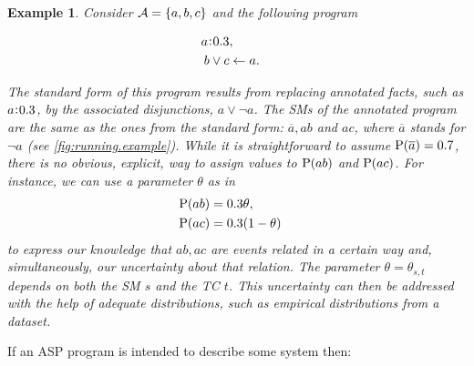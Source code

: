 \documentclass[a4paper, 10pt]{article}
\newtheorem{example}{Example}
\newcommand{\at}[1]{\ensuremath{\!\del{#1}}}
\newcommand{\co}[1]{\ensuremath{\overline{#1}}}
\newcommand{\fml}[1]{\ensuremath{{\cal #1}}}
\newcommand{\pr}[1]{\ensuremath{\mathrm{P}\at{#1}}}
\newcommand{\probfact}[2]{\ensuremath{#2\mkern-4mu:\mkern-4mu#1}}
\newcounter{remark}
\newcommand{\note}[1]{
    \stepcounter{remark}%
    {\!\!\color{red}/}\footnotemark[\arabic{remark}]\!\!%
    \footnotetext[\arabic{remark}]{{\color{red}/}#1}
}
\begin{document}
\begin{example}\label{running.example}
    Consider $\fml{A} = \set{a, b, c}$ and the following program

    \begin{equation}
        \begin{aligned}
            \probfact{0.3}{a} & ,\cr
            b \vee c          & \leftarrow a.
        \end{aligned}
        \label{eq:example.1}
    \end{equation}

    The \emph{standard form} of this program results from replacing annotated facts, such as $\probfact{0.3}{a}$, by the associated disjunctions, $a \vee \neg a$. The \aclp{SM} of the annotated program are the same as the ones from the standard form:  $\co{a}, ab$ and $ac$, where $\co{a}$ stands for $\neg a$ (see \cref{fig:running.example}). While it is straightforward to assume $\pr{\co{a}}=0.7$, there is no obvious, explicit, way to assign values to $\pr{ab}$ and $\pr{ac}$. For instance, we can use a parameter $\theta$ as in
    $$
        \begin{aligned}
            \pr{ab} & = 0.3 \theta,\cr
            \pr{ac} & = 0.3 (1 - \theta)
        \end{aligned}
    $$
    to express our knowledge that $ab,ac$ are events related in a certain way and, simultaneously, our uncertainty about that relation. The pa\-ra\-me\-ter $\theta=\theta_{s,t}$ depends on both the \acl{SM} $s$ and the \acl{TC} $t$. This uncertainty can then be addressed with the help of adequate distributions, such as empirical distributions from a dataset.
\end{example}

If an \ac{ASP} program is intended to describe some system then:
\end{document}
